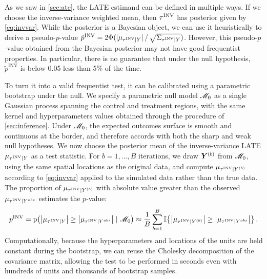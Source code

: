 As we saw in \autoref{sec:ate}, the LATE estimand can be defined in multiple ways.
If we choose the inverse-variance weighted mean, then \(\tau^{\mathrm{INV}}\) has posterior given by \autoref{eq:invvar}.
While the posterior is a Bayesian object, we can use it heuristically to derive a pseudo-\(p\)-value
\(
    \tilde{p}^{\mathrm{INV}} 
        = \allowbreak 2\Phi ( %
            | %
                \mu_{
                    \invvar \mid Y
                }
            | %
            \,/\,
            \allowbreak
            \sqrt{
                \Sigma_{\invvar \mid Y}
            }
    ) %
\).
However, this pseudo-\(p\)-value obtained from the Bayesian posterior may not have good frequentist properties.
In particular, there is no guarantee that under the null hypothesis, \(\tilde{p}^{\mathrm{INV}}\) is below 0.05 less than 5\% of the time.

To turn it into a valid frequentist test, it can be calibrated using a parametric bootstrap under the null.
We specify a parametric null model \(\mathscr{M}_0\)
as a single Gaussian process spanning the control and treatment regions,
with the same kernel and hyperparameters values obtained through the procedure of \autoref{sec:inference}.
Under \(\mathscr{M}_0\), the expected outcomes surface is smooth and continuous at the border,
and therefore accords with both the sharp and weak null hypotheses.
We now choose the posterior mean of the inverse-variance LATE \(\mu_{\tau^{\mathrm{INV}} \mid Y}\) as a test statistic.
For \(b=1,\dotsc,B\) iterations, we draw \(\bm{Y}^{(b)}\) from \(\mathscr{M}_0\),
using the same spatial locations as the original data,
and compute \(\mu_{\tau^{\mathrm{INV}} \mid Y^{(b)}}\) according to \autoref{eq:invvar} applied to the simulated data rather than the true data.
The proportion of \(\mu_{\tau^{\mathrm{INV}} \mid Y^{(b)}}\) with absolute value greater than the observed \(\mu_{\tau^{\mathrm{INV}} \mid Y^{obs}}\) estimates the \(p\)-value:
\begin{equation}
    p^{\mathrm{INV}} = \prob\del{ \abs{\mu_{\invvar \mid Y}} \ge \abs{\mu_{\invvar \mid Y^{obs}}} \mid \modnull} 
    \approx \frac{1}{B} 
    \sum_{b=1}^B 
        \Ind\cbr{
            \abs{
                \mu_{\invvar \mid Y^{(b)}}
            } 
            \ge  
            \abs{
                \mu_{\invvar \mid Y^{obs}}
            } 
        }
    \,.
\end{equation}
Computationally, because the hyperparameters and locations of the units are held constant during the bootstrap, we can reuse the Cholesky decomposition of the covariance matrix, allowing the test to be performed in seconds even with hundreds of units and thousands of bootstrap samples.

